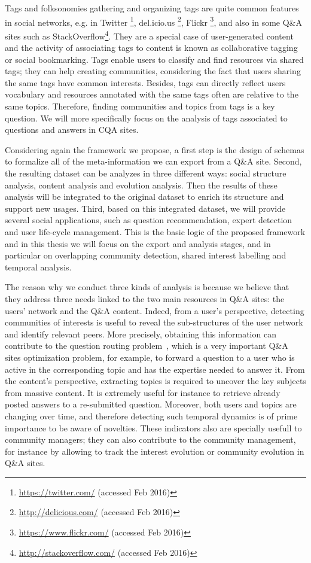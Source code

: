Tags and folksonomies gathering and organizing tags are quite common features in social networks, e.g. in Twitter \footnote{\url{https://twitter.com/} (accessed Feb 2016)}, del.icio.us \footnote{\url{http://delicious.com/} (accessed Feb 2016)}, Flickr \footnote{\url{ https://www.flickr.com/} (accessed Feb 2016)}, and also in some Q\&A sites such as StackOverflow\footnote{\url{http://stackoverflow.com/} (accessed Feb 2016)}.
They are a special case of user-generated content and the activity of associating tags to content is known as collaborative tagging or social bookmarking.   
Tags enable users to classify and find resources via shared tags; they can help creating communities, considering the fact that users sharing the same tags have common interests. Besides, tags can directly reflect users vocabulary and resources annotated with the same tags often are relative to the same topics. Therefore, finding communities and topics from tags is a key question. 
We will more specifically focus on the analysis of tags associated to questions and answers in CQA sites. 


Considering again the framework we propose, a first step is the design of schemas to formalize all of the meta-information we can export from a Q\&A site. Second, the resulting dataset can be analyzes in three different ways: social structure analysis, content analysis and evolution analysis. Then the results of these analysis will be integrated to the original dataset to enrich its structure and support new usages. Third, based on this integrated dataset, we will provide several social applications, such as question recommendation, expert detection and user life-cycle management. This is the basic logic of the proposed framework and in this thesis we will focus on the export and analysis stages, and in particular on overlapping community detection, shared interest labelling and temporal analysis.


The reason why we conduct three kinds of analysis is because we believe that they address three needs linked to the two main resources in Q\&A sites: the users' network and the Q\&A content. Indeed, from a user's perspective, detecting communities of interests is useful to reveal the sub-structures of the user network and identify relevant peers. More precisely, obtaining this information can contribute to the question routing problem~\cite{li2010routing}\cite{Zhou:2012:CAQ:2187980.2188201}, which is a very important Q\&A sites optimization problem, for example, to forward a question to a user who is active in the corresponding topic and has the expertise needed to answer it.
From the content's perspective, extracting topics is required to uncover the key subjects from massive content.
It is extremely useful for instance to retrieve already posted answers to a re-submitted question.
Moreover, both users and topics are changing over time, and therefore detecting such temporal dynamics is of prime importance to be aware of novelties. These indicators also are specially usefull to community managers; they can also contribute to the community management, for instance by allowing to track the interest evolution or community evolution in Q\&A sites.



